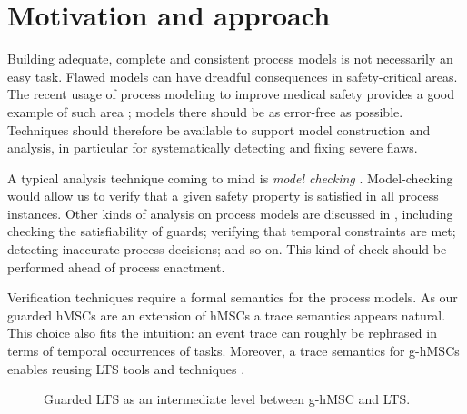 \section{Motivation and approach\label{section:deductive-motivation}}

Building adequate, complete and consistent process models is not necessarily an easy task. Flawed models can have dreadful consequences in safety-critical areas. The recent usage of process modeling to improve medical safety provides a good example of such area \cite{Clarke:2008, Grando:2009, Damas:2011}; models there should be as error-free as possible. Techniques should therefore be available to support model construction and analysis, in particular for systematically detecting and fixing severe flaws.

A typical analysis technique coming to mind is \emph{model checking} \cite{Clarke:1989}. Model-checking would allow us to verify that a given safety property is satisfied in all process instances. Other kinds of analysis on process models are discussed in \cite{Damas:2011}, including checking the satisfiability of guards; verifying that temporal constraints are met; detecting inaccurate process decisions; and so on. This kind of check should be performed ahead of process enactment.

Verification techniques require a formal semantics for the process models. As our guarded hMSCs are an extension of hMSCs a trace semantics appears natural. This choice also fits the intuition: an event trace can roughly be rephrased in terms of temporal occurrences of tasks. Moreover, a trace semantics for g-hMSCs enables reusing LTS tools and techniques \cite{Magee:1999, Giannakopoulou:2003}.

\begin{figure}\centering
{}
\caption{Guarded LTS as an intermediate level between g-hMSC and LTS.\label{image:deductive-chapter-overview}}
\end{figure}

